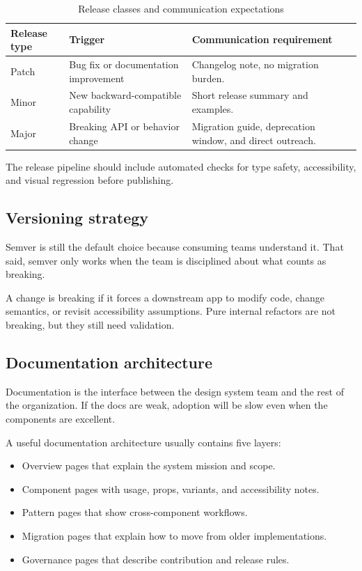 \begin{table}[htbp]
  \centering
  \caption{Release classes and communication expectations}
  \begin{tabularx}{\textwidth}{@{}p{}p{}X@{}}
    \toprule
    \textbf{Release type} & \textbf{Trigger} & \textbf{Communication requirement} \\
    \midrule
    Patch & Bug fix or documentation improvement & Changelog note, no migration burden. \\
    Minor & New backward-compatible capability & Short release summary and examples. \\
    Major & Breaking API or behavior change & Migration guide, deprecation window, and direct outreach. \\
    \bottomrule
  \end{tabularx}
\end{table}

The release pipeline should include automated checks for type safety, accessibility, and visual regression before publishing.

\subsection{Versioning strategy}
Semver is still the default choice because consuming teams understand it. That said, semver only works when the team is disciplined about what counts as breaking.

A change is breaking if it forces a downstream app to modify code, change semantics, or revisit accessibility assumptions. Pure internal refactors are not breaking, but they still need validation.

\subsection{Documentation architecture}
Documentation is the interface between the design system team and the rest of the organization. If the docs are weak, adoption will be slow even when the components are excellent.

A useful documentation architecture usually contains five layers:

\begin{itemize}[leftmargin=*, itemsep=0.35em]
  \item Overview pages that explain the system mission and scope.
  \item Component pages with usage, props, variants, and accessibility notes.
  \item Pattern pages that show cross-component workflows.
  \item Migration pages that explain how to move from older implementations.
  \item Governance pages that describe contribution and release rules.
\end{itemize}

